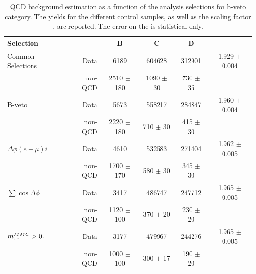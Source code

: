 \begin{table} [p]
	\begin{tabular}[c]{l r c c c c}
\hline
\hline 
Selection  &  		& B & C & D &  \rqcd \\ 
\hline
Common Selections 	&   Data	&6189			&604628			&312901		    &	1.929 $\pm$  	0.004		\\
	        &   non-QCD	&2510 $\pm$  180  	&1090 $\pm$   30  	&730	$\pm$ 35    &				\\
\hline
B-veto	     	&   Data	&5673		  & 558217 		& 284847		    &	1.960	$\pm$	0.004	\\
	     	&   non-QCD	&2220	$\pm$ 180 & 710 $\pm$ 30	& 415 $\pm$	30	    &				\\
\hline
$\Delta\phi(e-\mu)i$  &   Data		&4610		&532583 		&271404		    	    &	1.962	$\pm$	0.005	\\
	     &   non-QCD	&1700 $\pm$170	&580 $\pm$	30	& 345 $\pm$	30	    &				\\
\hline
$\sum\cos\Delta\phi$ &   Data& 3417	&486747 		& 247712	   		    &	1.965	$\pm$	0.005 	\\
	     &   non-QCD     & 1120  $\pm$ 100	& 370 $\pm$ 	20		& 230 $\pm$	20  &				\\
\hline
$m_{\tau\tau}^{MMC} > 0.$    &  Data		& 3177		& 479967 		& 244276	    	    &	1.965	$\pm$	0.005	\\
	     &   non-QCD	& 1000 $\pm$ 100	& 300  $\pm$ 17		&190	$\pm$ 20    &			\\[1ex]
\hline
\hline
	\end{tabular}
	\caption{QCD background estimation as a function of the analysis selections for b-veto category. The yields for the different control samples, as well as the scaling factor \rqcd, are reported. The error on the \rqcd is statistical only.}
	\centering
	\label{table:qcd_yield_bveto}
\end{table}



